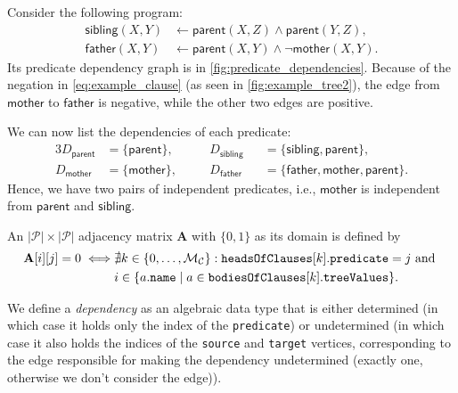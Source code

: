 \documentclass[runningheads]{llncs}
\newcommand{\variable}[1]{\texttt{\textup{#1}}}
\newcommand{\predicates}{\mathcal{P}}
\newcommand{\maxNumClauses}{\mathcal{M}_{\mathcal{C}}}
\begin{document}
\begin{example} \label{ex:program}
  Consider the following program:
  \begin{align}
    \mathsf{sibling}(X, Y) &\gets \mathsf{parent}(X, Z) \land \mathsf{parent}(Y, Z), \nonumber \\
    \mathsf{father}(X, Y) &\gets \mathsf{parent}(X, Y) \land \neg\mathsf{mother}(X, Y). \label{eq:example_clause}
  \end{align}
  Its predicate dependency graph is in \cref{fig:predicate_dependencies}.
  Because of the negation in \cref{eq:example_clause} (as seen in
  \cref{fig:example_tree2}), the edge from $\mathsf{mother}$ to
  $\mathsf{father}$ is negative, while the other two edges are positive.

  We can now list the dependencies of each predicate:
  \begin{alignat*}{3}
    D_{\mathsf{parent}} &= \{ \mathsf{parent} \}, \quad && D_{\mathsf{sibling}}
    &&= \{\mathsf{sibling}, \mathsf{parent} \},\\
    D_{\mathsf{mother}} &= \{ \mathsf{mother} \}, \quad && D_{\mathsf{father}}
    &&= \{ \mathsf{father}, \mathsf{mother}, \mathsf{parent} \}.
  \end{alignat*}
  Hence, we have two pairs of independent predicates, i.e., $\mathsf{mother}$ is
  independent from $\mathsf{parent}$ and $\mathsf{sibling}$.
\end{example}

\begin{definition}
  An $|\predicates{}| \times |\predicates{}|$ adjacency matrix $\mathbf{A}$ with
  $\{ 0, 1 \}$ as its domain is defined by
  \begin{align*}
    \mathbf{A}[i][j] = 0 \iff &\nexists k \in \{ 0, \dots, \maxNumClauses{} \}: \variable{headsOfClauses}[k].\variable{predicate} = j \text{ and } \\
    &i \in \{ a.\variable{name} \mid a \in \variable{bodiesOfClauses}[k].\variable{treeValues} \}.
  \end{align*}
\end{definition}

We define a \emph{dependency} as an algebraic data type that is either
determined (in which case it holds only the index of the \texttt{predicate}) or
undetermined (in which case it also holds the indices of the \texttt{source} and
\texttt{target} vertices, corresponding to the edge responsible for making the
dependency undetermined (exactly one, otherwise we don't consider the edge)).
\end{document}
